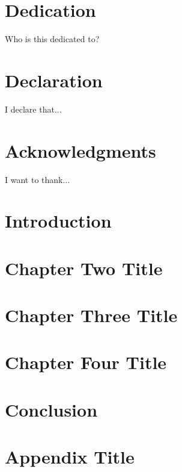 \documentclass[12pt,twoside]{report}
\begin{document}




\chapter*{Dedication}
Who is this dedicated to?

\chapter*{Declaration}
I declare that...

\chapter*{Acknowledgments}
I want to thank...

\tableofcontents
\listoffigures
\listoftables

\chapter{Introduction}


\chapter{Chapter Two Title}


\chapter{Chapter Three Title}


\chapter{Chapter Four Title}


\chapter{Conclusion}


\appendix
\chapter{Appendix Title}


\printbibliography 
\end{document}
